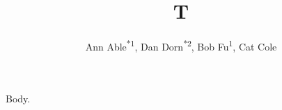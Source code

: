 \documentclass[sigconf,nonacm]{acmart}
\begin{document}
\title{T}
\author{Ann Able\textsuperscript{*1}, Dan Dorn\textsuperscript{*2}, Bob Fu\textsuperscript{1}, Cat Cole\textsuperscript{}}
\maketitle
Body.
\end{document}
